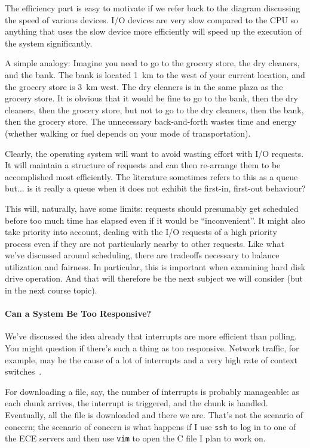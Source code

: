 The efficiency part is easy to motivate if we refer back to the diagram discussing the speed of various devices. I/O devices are very slow compared to the CPU so anything that uses the slow device more efficiently will speed up the execution of the system significantly.

A simple analogy: Imagine you need to go to the grocery store, the dry cleaners, and the bank. The bank is located 1~km to the west of your current location, and the grocery store is 3~km west. The dry cleaners is in the same plaza as the grocery store. It is obvious that it would be fine to go to the bank, then the dry cleaners, then the grocery store, but not to go to the dry cleaners, then the bank, then the grocery store. The unnecessary back-and-forth wastes time and energy (whether walking or fuel depends on your mode of transportation).

Clearly, the operating system will want to avoid wasting effort with I/O requests. It will maintain a structure of requests and can then re-arrange them to be accomplished most efficiently. The literature sometimes refers to this as a queue but... is it really a queue when it does not exhibit the first-in, first-out behaviour? 

This will, naturally, have some limits: requests should presumably get scheduled before too much time has elapsed even if it would be ``inconvenient''. It might also take priority into account, dealing with the I/O requests of a high priority process even if they are not particularly nearby to other requests. Like what we've discussed around scheduling, there are tradeoffs necessary to balance utilization and fairness. In particular, this is important when examining hard disk drive operation. And that will therefore be the next subject we will consider (but in the next course topic). 

\paragraph{Can a System Be Too Responsive?}
We've discussed the idea already that interrupts are more efficient than polling. You might question if there's such a thing as too responsive. Network traffic, for example, may be the cause of a lot of interrupts and a very high rate of context switches~\cite{osc}.

For downloading a file, say, the number of interrupts is probably manageable: as each chunk arrives, the interrupt is triggered, and the chunk is handled. Eventually, all the file is downloaded and there we are. That's not the scenario of concern; the scenario of concern is what happens if I use \texttt{ssh} to log in to one of the ECE servers and then use \texttt{vim} to open the C file I plan to work on.

